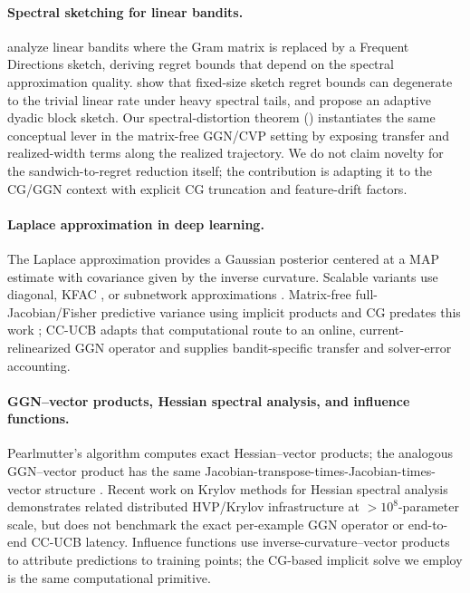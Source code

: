 \documentclass[twoside]{article}
\begin{document}
\paragraph{Spectral sketching for linear bandits.}
\citet{kuzborskij2019efficient} analyze linear bandits where the Gram
matrix is replaced by a Frequent Directions sketch, deriving regret
bounds that depend on the spectral approximation quality.
\citet{wen2026revisiting} show that fixed-size sketch regret bounds can
degenerate to the trivial linear rate under heavy spectral tails, and propose
an adaptive dyadic block sketch.
Our spectral-distortion theorem () instantiates the
same conceptual lever in the matrix-free GGN/CVP setting by exposing transfer
and realized-width terms along the realized trajectory.
We do not claim novelty for the sandwich-to-regret reduction itself;
the contribution is adapting it to the CG/GGN context with explicit
CG truncation and feature-drift factors.

\paragraph{Laplace approximation in deep learning.}
The Laplace approximation \citep{mackay1992practical,ritter2018scalable}
provides a Gaussian posterior centered at a MAP estimate with covariance
given by the inverse curvature.  Scalable variants use diagonal, KFAC
\citep{martens2015optimizing}, or subnetwork approximations
\citep{daxberger2021laplace}.  Matrix-free full-Jacobian/Fisher predictive
variance using implicit products and CG predates this work
\citep{maddox2021fast}; CC-UCB adapts that computational route to an online,
current-relinearized GGN operator and supplies bandit-specific transfer and
solver-error accounting.

\paragraph{GGN--vector products, Hessian spectral analysis, and influence
functions.}
Pearlmutter's algorithm \citep{pearlmutter1994fast} computes exact
Hessian--vector products; the analogous GGN--vector product has the same
Jacobian-transpose-times-Jacobian-times-vector structure
\citep{schraudolph2002fast}.
Recent work on Krylov methods for Hessian spectral analysis
\citep{granziol2026hessian} demonstrates related distributed HVP/Krylov
infrastructure at $>10^8$-parameter scale, but does not benchmark the exact
per-example GGN operator or end-to-end CC-UCB latency.
Influence functions
\citep{koh2017understanding} use inverse-curvature--vector products to
attribute predictions to training points; the CG-based implicit solve
we employ is the same computational primitive.
\end{document}
